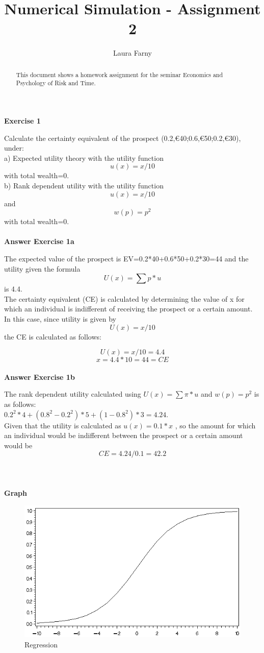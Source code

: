 \documentclass[12pt]{article}
\begin{document}
	
\title{Numerical Simulation - Assignment 2}
\author{Laura Farny}

{}


\begin{abstract}
	This document shows a homework assignment for the seminar Economics and Psychology of Risk and Time.
	
\end{abstract}

\textbf {Exercise 1\\}

Calculate the certainty equivalent of the prospect (0.2,€40;0.6,€50;0.2,€30), under: \\
a) Expected utility theory with the utility function \[u(x) =x/10\] with total wealth=0. \\
b) Rank dependent utility with the utility function \[u(x) =x/10\] and \[w(p) = p^{2}\] with total wealth=0. \\
\\


\textbf {Answer Exercise 1a\\}

The expected value of the prospect is EV=0.2*40+0.6*50+0.2*30=44 and the utility given the formula \[U(x)=\sum p*u\] is 4.4.\\
The certainty equivalent (CE) is calculated by determining the value of x for which an individual is indifferent of receiving the prospect or a certain amount. In this case, since utility is given by \[U(x)=x/10\]  the CE is calculated as follows:

\[U(x)=x/10 =4.4\]
\[x=4.4*10=44=CE\]\\


\textbf {Answer Exercise 1b\\}

The rank dependent utility calculated using \(U(x)=\sum \pi *u\) and \(w(p)=p^{2}\) is as follows: \\
\(0.2^{2}*4 + (0.8^{2}-0.2^{2})*5 + (1-0.8^{2})*3 = 4.24\). \\
Given that the utility is calculated as \(u(x)=0.1*x\) , so the amount for which an individual would be indifferent between the prospect or a certain amount would be \[CE=4.24/0.1=42.2\]\\
\\
\\


\textbf {Graph\\}

\begin{figure}
\caption{Regression}
\includegraphics{graph}
\end{figure}
\end{document}
